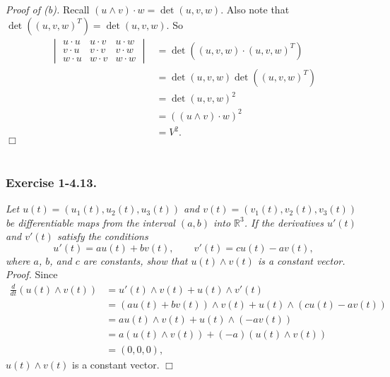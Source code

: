 \documentclass{article}
\begin{document}
\emph{Proof of (b).}
  Recall $(u \wedge v) \cdot w = \det(u,v,w)$.
  Also note that $\det((u,v,w)^{T}) = \det(u,v,w)$.
  So
  \begin{align*}
    \begin{vmatrix}
      u \cdot u & u \cdot v & u \cdot w \\
      v \cdot u & v \cdot v & v \cdot w \\
      w \cdot u & w \cdot v & w \cdot w
    \end{vmatrix}
    &= \det((u,v,w) \cdot (u,v,w)^{T}) \\
    &= \det(u,v,w) \det((u,v,w)^{T}) \\
    &= \det(u,v,w)^2 \\
    &= ((u \wedge v) \cdot w)^2 \\
    &= V^2.
  \end{align*}
$\Box$ \\\\






\subsubsection*{Exercise 1-4.13.}
\emph{Let $u(t) = (u_1(t), u_2(t), u_3(t))$ and $v(t) = (v_1(t), v_2(t), v_3(t))$
be differentiable maps from the interval $(a,b)$ into $\mathbb{R}^3$.
If the derivatives $u'(t)$ and $v'(t)$ satisfy the conditions
\[
  u'(t) = au(t) + bv(t),
  \qquad
  v'(t) = cu(t) - av(t),
\]
where $a$, $b$, and $c$ are constants, show that
$u(t) \wedge v(t)$ is a constant vector.} \\



\emph{Proof.}
Since
\begin{align*}
  \frac{d}{dt}(u(t) \wedge v(t))
  &= u'(t) \wedge v(t) + u(t) \wedge v'(t) \\
  &= (au(t) + bv(t))\wedge v(t) + u(t) \wedge (cu(t) - av(t)) \\
  &= au(t) \wedge v(t) + u(t) \wedge (-av(t)) \\
  &= a(u(t) \wedge v(t)) + (-a)(u(t) \wedge v(t)) \\
  &= (0, 0, 0),
\end{align*}
$u(t) \wedge v(t)$ is a constant vector.
$\Box$ \\\\
\end{document}
